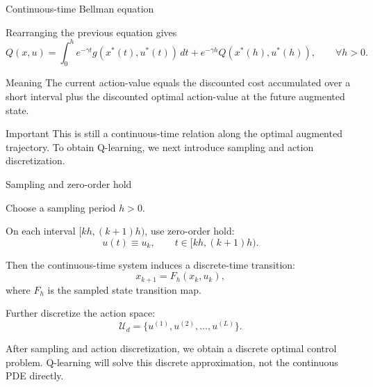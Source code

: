 \documentclass[aspectratio=169]{beamer}
\begin{document}
\begin{frame}{Continuous-time Bellman equation}

Rearranging the previous equation gives
\[
Q(x,u)
=
\int_0^h e^{-\gamma t}g(x^*(t),u^*(t))\,dt
+
e^{-\gamma h}Q(x^*(h),u^*(h)),
\qquad
\forall h>0.
\]

\vspace{0.2cm}

\begin{block}{Meaning}
\small
The current action-value equals the discounted cost accumulated over a short interval plus the discounted optimal action-value at the future augmented state.
\end{block}

\vspace{0.2cm}

\begin{alertblock}{Important}
\small
This is still a continuous-time relation along the optimal augmented trajectory.
To obtain Q-learning, we next introduce sampling and action discretization.
\end{alertblock}

\end{frame}


\begin{frame}{Sampling and zero-order hold}

Choose a sampling period \(h>0\).



On each interval \([kh,(k+1)h)\), use zero-order hold:
\[
u(t)\equiv u_k,
\qquad
t\in[kh,(k+1)h).
\]



Then the continuous-time system induces a discrete-time transition:
\[
x_{k+1}=F_h(x_k,u_k),
\]
where \(F_h\) is the sampled state transition map.



Further discretize the action space:
\[
\mathcal U_d
=
\{u^{(1)},u^{(2)},\ldots,u^{(L)}\}.
\]




After sampling and action discretization, we obtain a discrete optimal control problem.
Q-learning will solve this discrete approximation, not the continuous PDE directly.


\end{frame}
\end{document}
